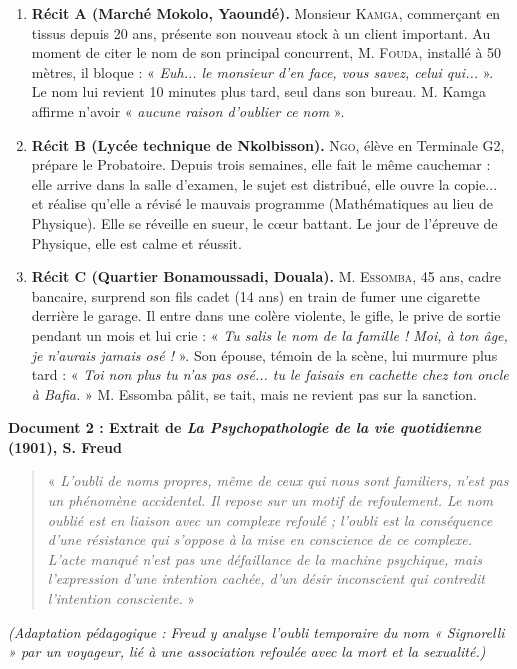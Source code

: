 \documentclass[11pt]{article}
\begin{document}
\begin{enumerate}
    \item \textbf{Récit A (Marché Mokolo, Yaoundé).} Monsieur \textsc{Kamga}, commerçant en tissus depuis 20 ans, présente son nouveau stock à un client important. Au moment de citer le nom de son principal concurrent, \textsc{M. Fouda}, installé à 50 mètres, il bloque : « \emph{Euh... le monsieur d'en face, vous savez, celui qui...} ». Le nom lui revient 10 minutes plus tard, seul dans son bureau. M. Kamga affirme n'avoir « \emph{aucune raison d'oublier ce nom} ».
    \item \textbf{Récit B (Lycée technique de Nkolbisson).} \textsc{Ngo}, élève en Terminale G2, prépare le Probatoire. Depuis trois semaines, elle fait le même cauchemar : elle arrive dans la salle d'examen, le sujet est distribué, elle ouvre la copie... et réalise qu'elle a révisé le mauvais programme (Mathématiques au lieu de Physique). Elle se réveille en sueur, le cœur battant. Le jour de l'épreuve de Physique, elle est calme et réussit.
    \item \textbf{Récit C (Quartier Bonamoussadi, Douala).} \textsc{M. Essomba}, 45 ans, cadre bancaire, surprend son fils cadet (14 ans) en train de fumer une cigarette derrière le garage. Il entre dans une colère violente, le gifle, le prive de sortie pendant un mois et lui crie : « \emph{Tu salis le nom de la famille ! Moi, à ton âge, je n'aurais jamais osé !} ». Son épouse, témoin de la scène, lui murmure plus tard : « \emph{Toi non plus tu n'as pas osé... tu le faisais en cachette chez ton oncle à Bafia.} » M. Essomba pâlit, se tait, mais ne revient pas sur la sanction.
\end{enumerate}

\textbf{Document 2 : Extrait de \emph{La Psychopathologie de la vie quotidienne} (1901), S. Freud}
\begin{quote}
« \emph{L'oubli de noms propres, même de ceux qui nous sont familiers, n'est pas un phénomène accidentel. Il repose sur un motif de refoulement. Le nom oublié est en liaison avec un complexe refoulé ; l'oubli est la conséquence d'une résistance qui s'oppose à la mise en conscience de ce complexe. L'acte manqué n'est pas une défaillance de la machine psychique, mais l'expression d'une intention cachée, d'un désir inconscient qui contredit l'intention consciente.} » 
\end{quote}
\textit{(Adaptation pédagogique : Freud y analyse l'oubli temporaire du nom « Signorelli » par un voyageur, lié à une association refoulée avec la mort et la sexualité.)}
\end{document}
